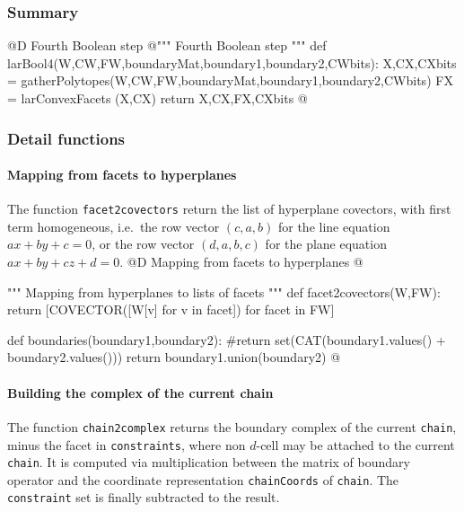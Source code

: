 \documentclass[11pt,oneside]{article}	%
\begin{document}
\subsubsection{Summary}


@D Fourth Boolean step
@{""" Fourth Boolean step """
def larBool4(W,CW,FW,boundaryMat,boundary1,boundary2,CWbits):
	X,CX,CXbits = gatherPolytopes(W,CW,FW,boundaryMat,boundary1,boundary2,CWbits)
	FX = larConvexFacets (X,CX)
	return X,CX,FX,CXbits
@}


\subsubsection{Detail functions}




\paragraph{Mapping from facets to hyperplanes}
The function \texttt{facet2covectors} return the list of hyperplane covectors, with first term homogeneous, i.e.~the row vector $(c,a,b)$ for the line equation $ax+by+c=0$, or the row vector $(d,a,b,c)$ for the plane equation $ax+by+cz+d=0$.
@D Mapping from facets to hyperplanes
@{""" Mapping from hyperplanes to lists of facets """
def facet2covectors(W,FW):
	return [COVECTOR([W[v] for v in facet]) for facet in FW]

def boundaries(boundary1,boundary2):
	#return set(CAT(boundary1.values() + boundary2.values()))
	return boundary1.union(boundary2)
@}

\paragraph{Building the complex of the current chain}
The function \texttt{chain2complex} returns the boundary complex of the current \texttt{chain}, minus the facet in \texttt{constraints}, where non $d$-cell may be attached to the current \texttt{chain}.
It is computed via multiplication between the matrix of boundary operator and the coordinate representation \texttt{chainCoords} of \texttt{chain}. The \texttt{constraint} set is finally subtracted to the result.  
\end{document}
